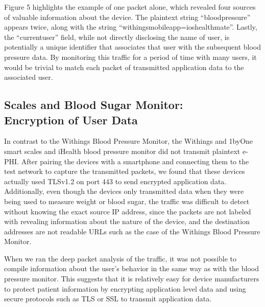 Figure 5 highlights the example of one packet alone, which revealed four sources of valuable information about the device. The plaintext string ``blood\textunderscore pressure'' appears twice, along with the string ``withings\textunderscore mobile\textunderscore app=ios\textunderscore healthmate''. Lastly, the ``current\textunderscore user'' field, while not directly disclosing the name of user, is potentially a unique identifier that associates that user with the subsequent blood pressure data. By monitoring this traffic for a period of time with many users, it would be trivial to match each packet of transmitted application data to the associated user. 

\subsection{Scales and Blood Sugar Monitor: \\ Encryption of User Data}

In contrast to the Withings Blood Pressure Monitor, the Withings and 1byOne
smart scales and iHealth blood pressure monitor did not transmit plaintext
e-PHI. After pairing the devices with a smartphone and connecting them to the
test network to capture the transmitted packets, we found that these devices
actually used TLSv1.2 on port 443 to send encrypted application data.
Additionally, even though the devices only transmitted data when they were
being used to measure weight or blood sugar, the traffic was difficult to
detect without knowing the exact source IP address, since the packets are not
labeled with revealing information about the nature of the device, and the
destination addresses are not readable URLs such as the case of the Withings
Blood Pressure Monitor.

When we ran the deep packet analysis of the traffic, it was not
possible to compile information about the user's behavior in the same way as
with the blood pressure monitor. This suggests that it is relatively easy for
device manufacturers to protect patient information by encrypting
application level data and using secure protocols such as TLS or SSL to
transmit application data.




